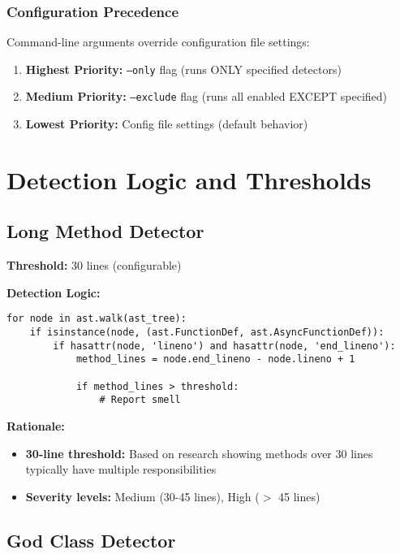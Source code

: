 \documentclass[11pt,a4paper]{article}
\begin{document}
\subsubsection{Configuration Precedence}

Command-line arguments override configuration file settings:

\begin{enumerate}[noitemsep]
    \item \textbf{Highest Priority:} \texttt{--only} flag (runs ONLY specified detectors)
    \item \textbf{Medium Priority:} \texttt{--exclude} flag (runs all enabled EXCEPT specified)
    \item \textbf{Lowest Priority:} Config file settings (default behavior)
\end{enumerate}

\section{Detection Logic and Thresholds}

\subsection{Long Method Detector}

\textbf{Threshold:} 30 lines (configurable)

\textbf{Detection Logic:}
\begin{lstlisting}[caption={Long Method Detection}]
for node in ast.walk(ast_tree):
    if isinstance(node, (ast.FunctionDef, ast.AsyncFunctionDef)):
        if hasattr(node, 'lineno') and hasattr(node, 'end_lineno'):
            method_lines = node.end_lineno - node.lineno + 1
            
            if method_lines > threshold:
                # Report smell
\end{lstlisting}

\textbf{Rationale:}
\begin{itemize}[noitemsep]
    \item \textbf{30-line threshold:} Based on research showing methods over 30 lines typically have multiple responsibilities
    \item \textbf{Severity levels:} Medium (30-45 lines), High ($>$ 45 lines)
\end{itemize}

\subsection{God Class Detector}
\end{document}
